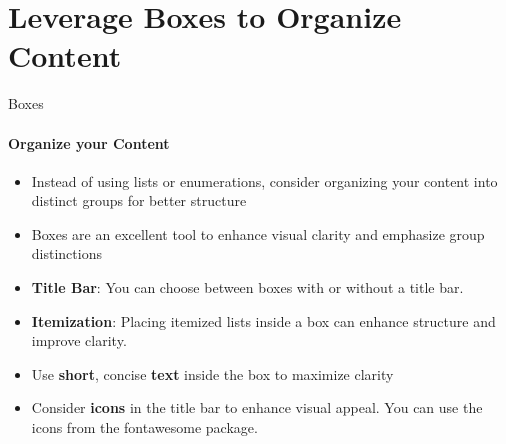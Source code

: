 \documentclass[aspectratio=169]{beamer}
\begin{document}
\section{Leverage \textbf{Boxes} to Organize Content}

\begin{frame}
\end{frame}


\begin{frame}{Boxes}
    \framesubtitle{Organize your Content}
    \begin{coloredblock}[yellow]
        \begin{itemize}
            \item Instead of using lists or enumerations, consider organizing your content into distinct groups for better structure
            \item Boxes are an excellent tool to enhance visual clarity and emphasize group distinctions
        \end{itemize}
    \end{coloredblock}

    \begin{minipage}[t]{0.49\textwidth}
        \begin{coloredblock}
            \begin{itemize}
                \item \textbf{Title Bar}: You can choose between boxes with or without a title bar.
                \item \textbf{Itemization}: Placing itemized lists inside a box can enhance structure and improve clarity.
            \end{itemize}
        \end{coloredblock}
    \end{minipage}
    \hfill
    \begin{minipage}[t]{0.49\textwidth}
        \begin{coloredblock}
            \begin{itemize}
                \item Use \textbf{short}, concise \textbf{text} inside the box to maximize clarity
                \item Consider \textbf{icons} in the title bar to enhance visual appeal. You can use the icons from the fontawesome package.
            \end{itemize}
        \end{coloredblock}
    \end{minipage}
\end{frame}
\end{document}
